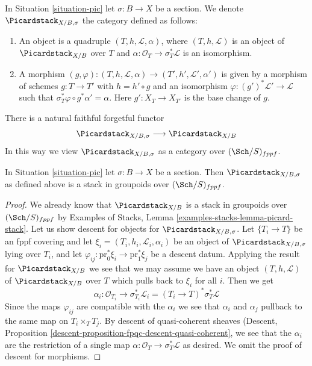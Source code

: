 \noindent
In Situation \ref{situation-pic} let $\sigma : B \to X$ be a section.
We denote $\Picardstack_{X/B, \sigma}$ the category defined as follows:
\begin{enumerate}
\item An object is a quadruple $(T, h, \mathcal{L}, \alpha)$, where
$(T, h, \mathcal{L})$ is an object of $\Picardstack_{X/B}$ over $T$ and
$\alpha : \mathcal{O}_T \to \sigma_T^*\mathcal{L}$
is an isomorphism.
\item A morphism $(g, \varphi) : (T, h, \mathcal{L}, \alpha)
\to (T', h', \mathcal{L}', \alpha')$
is given by a morphism of schemes $g : T \to T'$ with $h = h' \circ g$
and an isomorphism $\varphi : (g')^*\mathcal{L}' \to \mathcal{L}$
such that $\sigma_T^*\varphi \circ g^*\alpha' = \alpha$.
Here $g' : X_T \to X_{T'}$ is the base change of $g$.
\end{enumerate}
There is a natural faithful forgetful functor
$$
\Picardstack_{X/B, \sigma} \longrightarrow
\Picardstack_{X/B}
$$
In this way we view $\Picardstack_{X/B, \sigma}$ as a category
over $(\Sch/S)_{fppf}$.

\begin{lemma}
\label{lemma-pic-with-section-stack}
In Situation \ref{situation-pic} let $\sigma : B \to X$ be a section.
Then $\Picardstack_{X/B, \sigma}$ as defined above is a stack in
groupoids over $(\Sch/S)_{fppf}$.
\end{lemma}

\begin{proof}
We already know that $\Picardstack_{X/B}$ is a stack in groupoids
over $(\Sch/S)_{fppf}$ by
Examples of Stacks, Lemma \ref{examples-stacks-lemma-picard-stack}.
Let us show descent for objects for $\Picardstack_{X/B, \sigma}$.
Let $\{T_i \to T\}$ be an fppf covering and let
$\xi_i = (T_i, h_i, \mathcal{L}_i, \alpha_i)$ be an object of
$\Picardstack_{X/B, \sigma}$ lying over $T_i$, and let
$\varphi_{ij} : \text{pr}_0^*\xi_i \to \text{pr}_1^*\xi_j$
be a descent datum. Applying the result for $\Picardstack_{X/B}$
we see that we may assume we have an object $(T, h, \mathcal{L})$
of $\Picardstack_{X/B}$ over $T$ which pulls back to $\xi_i$ for all $i$.
Then we get
$$
\alpha_i : \mathcal{O}_{T_i} \to \sigma_{T_i}^*\mathcal{L}_i =
(T_i \to T)^*\sigma_T^*\mathcal{L}
$$
Since the maps $\varphi_{ij}$ are compatible with the $\alpha_i$
we see that $\alpha_i$ and $\alpha_j$ pullback to the same map
on $T_i \times_T T_j$. By descent of quasi-coherent sheaves
(Descent, Proposition \ref{descent-proposition-fpqc-descent-quasi-coherent},
we see that the $\alpha_i$ are the restriction of a single map
$\alpha : \mathcal{O}_T \to \sigma_T^*\mathcal{L}$ as desired.
We omit the proof of descent for morphisms.
\end{proof}

